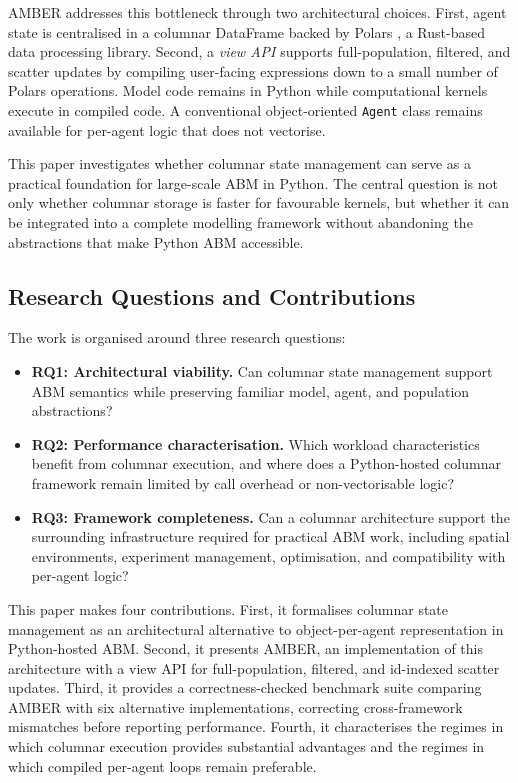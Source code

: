 \documentclass[11pt,a4paper]{article}
\begin{document}
AMBER addresses this bottleneck through two architectural choices. First, agent state is centralised in a columnar DataFrame backed by Polars \citep{polars_zenodo}, a Rust-based data processing library. Second, a \emph{view API} supports full-population, filtered, and scatter updates by compiling user-facing expressions down to a small number of Polars operations. Model code remains in Python while computational kernels execute in compiled code. A conventional object-oriented \texttt{Agent} class remains available for per-agent logic that does not vectorise.

This paper investigates whether columnar state management can serve as a practical foundation for large-scale ABM in Python. The central question is not only whether columnar storage is faster for favourable kernels, but whether it can be integrated into a complete modelling framework without abandoning the abstractions that make Python ABM accessible.

\subsection{Research Questions and Contributions}

The work is organised around three research questions:

\begin{itemize}
\item \textbf{RQ1: Architectural viability.} Can columnar state management support ABM semantics while preserving familiar model, agent, and population abstractions?
\item \textbf{RQ2: Performance characterisation.} Which workload characteristics benefit from columnar execution, and where does a Python-hosted columnar framework remain limited by call overhead or non-vectorisable logic?
\item \textbf{RQ3: Framework completeness.} Can a columnar architecture support the surrounding infrastructure required for practical ABM work, including spatial environments, experiment management, optimisation, and compatibility with per-agent logic?
\end{itemize}

This paper makes four contributions. First, it formalises columnar state management as an architectural alternative to object-per-agent representation in Python-hosted ABM. Second, it presents AMBER, an implementation of this architecture with a view API for full-population, filtered, and id-indexed scatter updates. Third, it provides a correctness-checked benchmark suite comparing AMBER with six alternative implementations, correcting cross-framework mismatches before reporting performance. Fourth, it characterises the regimes in which columnar execution provides substantial advantages and the regimes in which compiled per-agent loops remain preferable.
\end{document}
